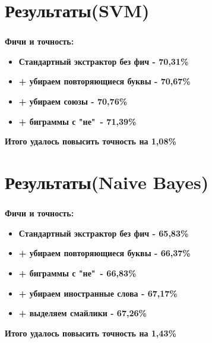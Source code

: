 \documentclass[t]{beamer}
\begin{document}
    \section{Результаты(SVM)}
    \begin{frame}
    	\frametitle{\insertsection}
		\textbf{Фичи и точность:}
		\begin{itemize}
        	\item \textbf{Стандартный экстрактор без фич - 70,31\%}
            \item \textbf{+ убираем повторяющиеся буквы - 70,67\%}
            \item \textbf{+ убираем союзы - 70,76\%}
            \item \textbf{+ биграммы с "не"\ - 71,39\%}
        \end{itemize}
        \textbf{\newline \newline Итого удалось повысить точность на 1,08\%}
    \end{frame}
    
    \section{Результаты(Naive Bayes)}
   \begin{frame}
   		\frametitle{\insertsection}
        \textbf{Фичи и точность:}
        \begin{itemize}
        	\item \textbf{Стандартный экстрактор без фич - 65,83\%}
            \item \textbf{+ убираем повторяющиеся буквы - 66,37\%}
            \item \textbf{+ биграммы с "не"\ - 66,83\%}
            \item \textbf{+ убираем иностранные слова - 67,17\%}
            \item \textbf{+ выделяем смайлики - 67,26\%}
        \end{itemize}
        \textbf{\newline \newline Итого удалось повысить точность на 1,43\%}
   \end{frame}
    
\end{document}
